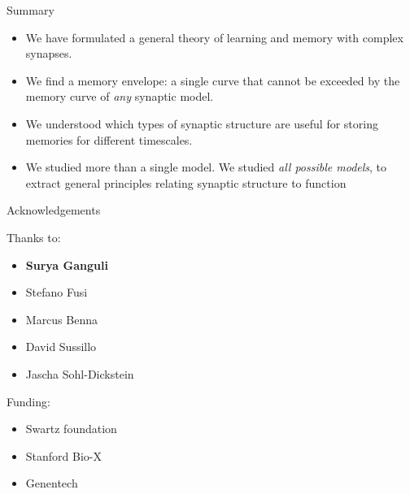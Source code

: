 \documentclass{beamer}%
\begin{document}
\begin{frame}{Summary}
%
  \begin{itemize}
    \item We have formulated a general theory of learning and memory with complex synapses.
    \vp\item We find a memory envelope: a single curve that cannot be exceeded by the memory curve of \emph{any} synaptic model.
    \vp\item We understood which types of synaptic structure are useful for storing memories for different timescales.
    \vp\item We studied more than a single model. We studied \emph{all possible models}, to extract general principles relating synaptic structure to function
  \end{itemize}

%
\end{frame}





%
%
%

\begin{frame}{Acknowledgements}
%
\parbox[t]{0.4\linewidth}{
 Thanks to:
 \begin{itemize}
   \item \textbf{Surya Ganguli}
   \item Stefano Fusi
   \item Marcus Benna
   \item David Sussillo
   \item Jascha Sohl-Dickstein
 \end{itemize}
 }
\parbox[t]{0.4\linewidth}{
 Funding:
 \begin{itemize}
   \item Swartz foundation
   \item Stanford Bio-X
   \item Genentech
 \end{itemize}
 }
%
\end{frame}
\end{document}
